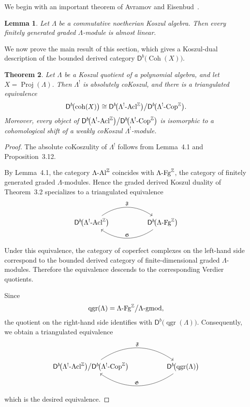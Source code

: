 \documentclass[11pt]{article}
\newtheorem{theorem}{Theorem}[section]
\newtheorem{lemma}[theorem]{Lemma}
\theoremstyle{definition}
\theoremstyle{remark}
\begin{document}
\medskip

We begin with an important theorem of Avramov and Eisenbud~\cite{2}. \begin{lemma} Let \(\Lambda\) be a commutative noetherian Koszul algebra. Then every finitely generated graded \(\Lambda\)-module is almost linear. \end{lemma}
We now prove the main result of this section, which gives a Koszul-dual
description of the bounded derived category
\(\mathsf{D}^{b}\!\bigl(\operatorname{Coh}(X)\bigr)\). 

\begin{theorem} Let \(\Lambda\) be a Koszul quotient of a polynomial algebra, and let \(X=\operatorname{Proj}(\Lambda)\). Then \(\Lambda^{!}\) is absolutely coKoszul, and there is a triangulated equivalence \[ \mathsf{D}^{b}\!\bigl(\operatorname{coh}(X)\bigr) \cong \mathsf{D}^{b}\!\bigl(\Lambda^{!}\textup{-}\mathrm{Acl}^{\mathbb{Z}}\bigr) \big/ \mathsf{D}^{b}\!\bigl(\Lambda^{!}\textup{-}\mathrm{Cop}^{\mathbb{Z}}\bigr). \] Moreover, every object of \(  \mathsf{D}^{b}\!\bigl(\Lambda^{!}\textup{-}\mathrm{Acl}^{\mathbb{Z}}\bigr) \big/ \mathsf{D}^{b}\!\bigl(\Lambda^{!}\textup{-}\mathrm{Cop}^{\mathbb{Z}}\bigr) \) is isomorphic to a cohomological shift of a weakly coKoszul \(\Lambda^{!}\)-module. \end{theorem} \begin{proof}
The absolute coKoszulity of \(\Lambda^{!}\) follows from Lemma~4.1 and
Proposition~3.12.

By Lemma~4.1, the category
\(\Lambda\textup{-}\mathrm{Al}^{\mathbb{Z}}\) coincides with
\(\Lambda\textup{-}\mathrm{Fg}^{\mathbb{Z}}\), the category of finitely
generated graded \(\Lambda\)-modules. Hence the graded derived Koszul duality
of Theorem~3.2 specializes to a triangulated equivalence
\[
\begin{tikzcd}[column sep=huge]
\mathsf{D}^{b}\!\bigl(\Lambda^{!}\textup{-}\mathrm{Acl}^{\mathbb{Z}}\bigr)
\arrow[r, bend left=35, "\mathfrak{F}"]
&
\mathsf{D}^{b}\!\bigl(\Lambda\textup{-}\mathrm{Fg}^{\mathbb{Z}}\bigr)
\arrow[l, bend left=35, "\mathfrak{G}"']
\end{tikzcd}
\]
Under this equivalence, the category of coperfect complexes on the left-hand side
correspond to the bounded derived category of finite-dimensional graded
\(\Lambda\)-modules. Therefore the equivalence descends to the corresponding
Verdier quotients.

Since
\[
\operatorname{qgr}(\Lambda)
=
\Lambda\textup{-}\mathrm{Fg}^{\mathbb{Z}}
\big/
\Lambda\textup{-}\mathrm{gmod},
\]
the quotient on the right-hand side identifies with
\(\mathsf{D}^{b}\!\bigl(\operatorname{qgr}(\Lambda)\bigr)\). Consequently, we
obtain a triangulated equivalence
\[
\begin{tikzcd}[column sep=huge]
\mathsf{D}^{b}\!\bigl(\Lambda^{!}\textup{-}\mathrm{Acl}^{\mathbb{Z}}\bigr)
\big/
\mathsf{D}^{b}\!\bigl(\Lambda^{!}\textup{-Cop}^{\mathbb{Z}}\bigr)
\arrow[r, bend left=35, "\mathfrak{F}"]
&
\mathsf{D}^{b}\!\bigl(\operatorname{qgr}(\Lambda)\bigr)
\arrow[l, bend left=35, "\mathfrak{G}"']
\end{tikzcd}
\]
which is the desired equivalence.
\end{proof}
\end{document}
